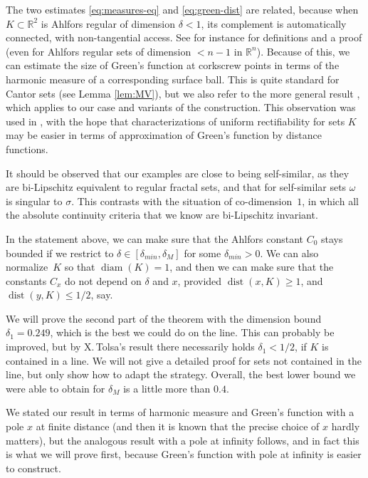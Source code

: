 \documentclass[10pt]{amsart}
\numberwithin{equation}{section}
\theoremstyle{plain}
\theoremstyle{definition}
\newcommand{\R}{\mathbb{R}}
\DeclareMathOperator{\dist}{dist}
\DeclareMathOperator{\diam}{diam}
\begin{document}
The two estimates \eqref{eq:measures-eq} and \eqref{eq:green-dist}
are related, because when $K \subset \R^2$ is Ahlfors regular of dimension
$\delta < 1$, its complement is automatically connected, with non-tangential access.
See for instance \cite[\S2]{DFM-Memoirs}
for definitions and a proof (even for Ahlfors regular sets of dimension $< n-1$ in $\R^n$).
Because of this, we can estimate the size of Green's function at
corkscrew points in terms of the harmonic measure of a corresponding surface ball.
This is quite standard for Cantor sets (see Lemma \ref{lem:MV}), but we also refer to the more general result
\cite[Lem.\,15.28]{DFM-Mixed},
which applies to our case and variants of the construction.
This observation was used in \cite{DM-Compactness},
with the hope that characterizations of uniform rectifiability for sets $K$ may
be easier in terms of approximation of Green's function by distance functions.

It should be observed that our examples are close to being self-similar, as
they are bi-Lipschitz equivalent to regular fractal sets, and that for self-similar sets
$\omega$ is singular to $\sigma$.
This contrasts with the situation of co-dimension~$1$,
in which all the absolute continuity criteria that we know are bi-Lipschitz invariant.

In the statement above, we can make sure that the Ahlfors constant $C_0$ stays bounded
if we restrict to $\delta \in [\delta_{min},\delta_M]$ for some $\delta_{min} > 0$.
We can also normalize~$K$ so that $\diam(K) = 1$, and then we can make sure that the constants $C_x$ do not depend on $\delta$ and $x$, provided $\dist(x,K) \geq 1$, and $\dist(y, K) \leq 1/2$, say.

We will prove the second part of the theorem with the dimension bound $\delta_1 = 0.249$, which is the best we could do on the line.
This can probably be improved, but by X.\,Tolsa's result there necessarily holds $\delta_1 < 1/2$, if $K$ is contained in a line.
We will not give a detailed proof for sets not contained in the line, but only show how to adapt the strategy. Overall, the best lower bound we were able to obtain for $\delta_M$ is a little more than $0.4$.

We stated our result in terms of harmonic measure and Green's function with a pole
$x$ at finite distance (and then it is known that the precise choice of $x$ hardly matters),
but the analogous result with a pole at infinity follows, and in fact this is what we will prove
first, because Green's function with pole at infinity is easier to construct.
\end{document}
